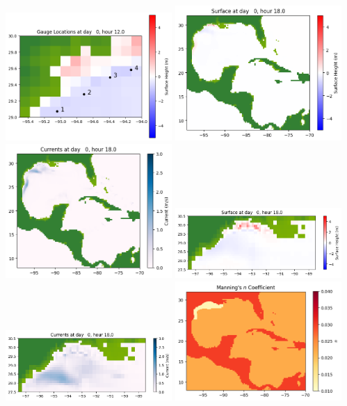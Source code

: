 \documentclass[11pt]{article}
\begin{document}
\includegraphics[width=0.475\textwidth]{frame0014fig1008.png}
\vskip 10pt 
\includegraphics[width=0.475\textwidth]{frame0015fig1001.png}
\includegraphics[width=0.475\textwidth]{frame0015fig1002.png}
\vskip 10pt 
\includegraphics[width=0.475\textwidth]{frame0015fig1003.png}
\includegraphics[width=0.475\textwidth]{frame0015fig1004.png}
\vskip 10pt 
\includegraphics[width=0.475\textwidth]{frame0015fig1005.png}
\end{document}
